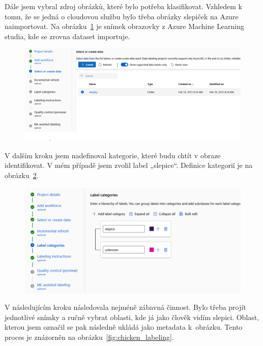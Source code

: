 Dále jsem vybral zdroj obrázků, které bylo potřeba klasifikovat.
Vzhledem k tomu, že se jedná o cloudovou službu bylo třeba obrázky slepiček na Azure naimportovat.
Na obrázku~\ref{fig:dataset_selection} je snímek obrazovky z Azure Machine Learning studia, kde se zrovna dataset importuje.

\begin{figure}[H]
    \centering
    \includegraphics[width=1.0\textwidth]{img/dataset_selection}
    \label{fig:dataset_selection}
\end{figure}

V dalším kroku jsem nadefinoval kategorie, které budu chtít v obraze identifikovat.
V mém případě jsem zvolil label „slepice“.
Definice kategorií je na obrázku~\ref{fig:category_definition}.

\begin{figure}[H]
    \centering
    \includegraphics[width=1.0\textwidth]{img/category_definition}
    \label{fig:category_definition}
\end{figure}

V následujícím kroku následovala nejméně zábavná činnost.
Bylo třeba projít jednotlivé snímky a ručně vybrat oblasti, kde já jako člověk vidím slepici.
Oblast, kterou jsem označil se pak následně ukládá jako metadata k~obrázku.
Tento proces je znázorněn na obrázku~\ref{fig:chicken_labeling}.

